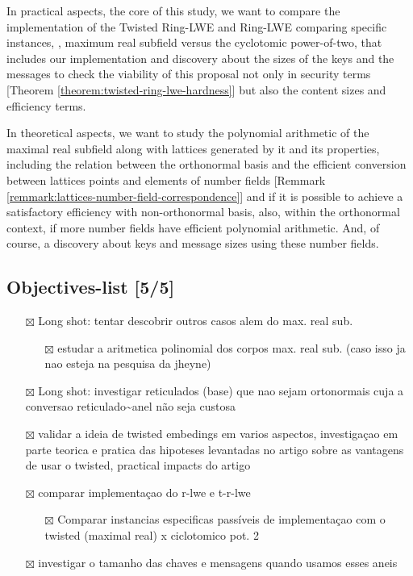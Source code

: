 \documentclass[a4paper,12pt]{article}
\begin{document}
In practical aspects, the core of this study, we want to compare the implementation of the Twisted Ring-LWE and Ring-LWE comparing specific instances, \ie, maximum real subfield versus the cyclotomic power-of-two, that includes our implementation and discovery about the sizes of the keys and the messages to check the viability of this proposal not only in security terms [Theorem \ref{theorem:twisted-ring-lwe-hardness}] but also the content sizes and efficiency terms.

In theoretical aspects, we want to study the polynomial arithmetic of the maximal real subfield along with lattices generated by it and its properties, including the relation between the orthonormal basis and the efficient conversion between lattices points and elements of number fields [Remmark \ref{remmark:lattices-number-field-correspondence}] and if it is possible to achieve a satisfactory efficiency with non-orthonormal basis, also, within the orthonormal context, if more number fields have efficient polynomial arithmetic. And, of course, a discovery about keys and message sizes using these number fields.
\subsection{Objectives-list [5/5]}
\label{sec:orgbe328c7}
\begin{itemize}
\item[{$\boxtimes$}] Long shot: tentar descobrir outros casos alem do max. real sub.
\begin{itemize}
\item[{$\boxtimes$}] estudar a aritmetica polinomial dos corpos max. real sub. (caso isso ja nao esteja na pesquisa da jheyne)
\end{itemize}
\item[{$\boxtimes$}] Long shot: investigar reticulados (base) que nao sejam ortonormais cuja a conversao reticulado\textasciitilde{}anel não seja custosa
\item[{$\boxtimes$}] validar a ideia de twisted embedings em varios aspectos, investigaçao em parte teorica e pratica das hipoteses levantadas
no artigo sobre as vantagens de usar o twisted, practical impacts do artigo
\item[{$\boxtimes$}] comparar implementaçao do r-lwe e t-r-lwe
\begin{itemize}
\item[{$\boxtimes$}] Comparar instancias especificas passíveis de implementaçao com o twisted (maximal real) x ciclotomico pot. 2
\end{itemize}

\item[{$\boxtimes$}] investigar o tamanho das chaves e mensagens quando usamos esses aneis
\end{itemize}
\end{document}
